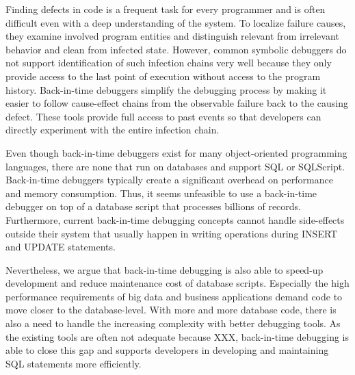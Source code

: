 \documentclass[english]{sig-alternate-05-2015}
\newcommand{\todo}[2][]{\pdfmargincomment[author={#1}]{#2}}
\begin{document}
Finding defects in code is a frequent task for every programmer and is often difficult even with a deep understanding of the system.
To localize failure causes, they examine involved program entities and distinguish relevant from irrelevant behavior and clean from infected state. 
However, common symbolic debuggers do not support identification of such infection chains very well because they only provide access to the last point of execution without access to the program history.
Back-in-time debuggers simplify the debugging process \todo{cite} by making it easier to follow cause-effect chains from the observable failure back to the causing defect.
These tools provide full access to past events so that developers can directly experiment with the entire infection chain. 

Even though back-in-time debuggers exist for many object-oriented programming languages\todo{cite}, there are none that run on databases and support SQL or SQLScript.
Back-in-time debuggers typically create a significant overhead on performance and memory consumption\todo{cite}.
Thus, it seems unfeasible to use a back-in-time debugger on top of a database script that processes billions of records.
Furthermore, current back-in-time debugging concepts cannot handle side-effects outside their system that usually happen in writing operations during INSERT and UPDATE statements. 

Nevertheless, we argue that back-in-time debugging is also able to speed-up development and reduce maintenance cost of database scripts.
Especially the high performance requirements of big data and business applications demand code to move closer to the database-level\todo{cite}.
With more and more database code, there is also a need to handle the increasing complexity with better debugging tools.
As the existing tools\todo{which one?} are often not adequate because XXX\todo{why}, back-in-time debugging is able to close this gap and supports developers in developing and maintaining SQL statements more efficiently. 
\end{document}
